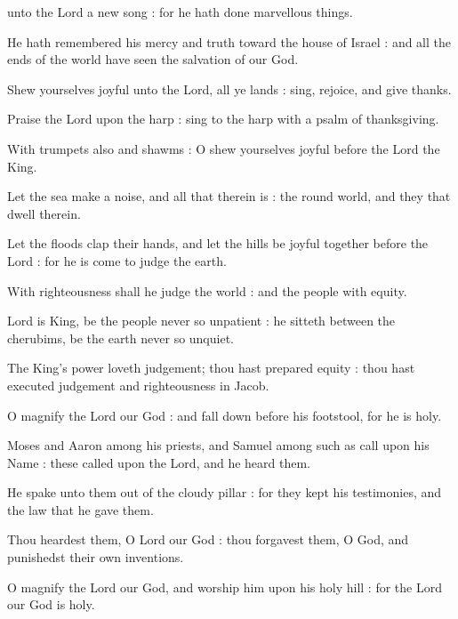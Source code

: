  unto the Lord a new song : for he hath done marvellous things.\par
{}
He hath remembered his mercy and truth toward the house of Israel : and all the ends of the world have seen the salvation of our God.\par
{}Shew yourselves joyful unto the Lord, all ye lands : sing, rejoice, and give thanks.\par
{}Praise the Lord upon the harp : sing to the harp with a psalm of thanksgiving.\par
{}With trumpets also and shawms : O shew yourselves joyful before the Lord the King.\par
{}Let the sea make a noise, and all that therein is : the round world, and they that dwell therein.\par
{}Let the floods clap their hands, and let the hills be joyful together before the Lord : for he is come to judge the earth.\par
{}With righteousness shall he judge the world : and the people with equity.\par


 Lord is King, be the people never so unpatient : he sitteth between the cherubims, be the earth never so unquiet.\par
{}
The King's power loveth judgement; thou hast prepared equity : thou hast executed judgement and righteousness in Jacob.\par
{}O magnify the Lord our God : and fall down before his footstool, for he is holy.\par
{}Moses and Aaron among his priests, and Samuel among such as call upon his Name : these called upon the Lord, and he heard them.\par
{}He spake unto them out of the cloudy pillar : for they kept his testimonies, and the law that he gave them.\par
{}Thou heardest them, O Lord our God : thou forgavest them, O God, and punishedst their own inventions.\par
{}O magnify the Lord our God, and worship him upon his holy hill : for the Lord our God is holy.\par

